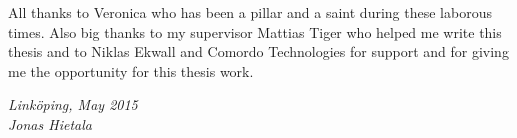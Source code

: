 \begin{acknowledgments}
  All thanks to Veronica who has been a pillar and a saint during these laborous times. Also big thanks to my supervisor Mattias Tiger who helped me write this thesis and to Niklas Ekwall and Comordo Technologies for support and for giving me the opportunity for this thesis work.

  \addvspace{1em}
  \begin{flushright}
    \textit{%
      Linköping, May 2015\\
      Jonas Hietala%
    }
  \end{flushright}
\end{acknowledgments}
